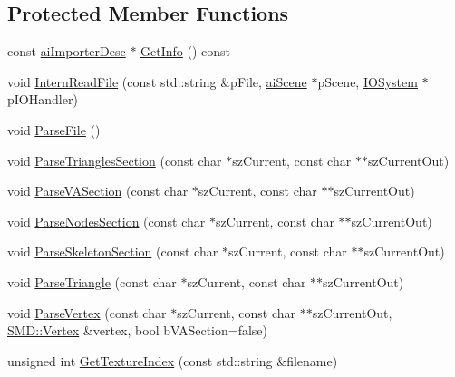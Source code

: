 \subsection*{Protected Member Functions}
\begin{DoxyCompactItemize}
\item 
const \hyperlink{structai_importer_desc}{ai\+Importer\+Desc} $\ast$ \hyperlink{class_assimp_1_1_s_m_d_importer_a0771ff94e143b92b6367358041272aa8}{Get\+Info} () const 
\item 
void \hyperlink{class_assimp_1_1_s_m_d_importer_a4f1ad132927d8077a231228223b392eb}{Intern\+Read\+File} (const std\+::string \&p\+File, \hyperlink{structai_scene}{ai\+Scene} $\ast$p\+Scene, \hyperlink{class_assimp_1_1_i_o_system}{I\+O\+System} $\ast$p\+I\+O\+Handler)
\item 
void \hyperlink{class_assimp_1_1_s_m_d_importer_a4075b3c88e26fa5d812dee09c4021223}{Parse\+File} ()
\item 
void \hyperlink{class_assimp_1_1_s_m_d_importer_a0dd80205c4b35fbade3d38da409c8738}{Parse\+Triangles\+Section} (const char $\ast$sz\+Current, const char $\ast$$\ast$sz\+Current\+Out)
\item 
void \hyperlink{class_assimp_1_1_s_m_d_importer_a735002509fc018d5fd3efb81c21da1d2}{Parse\+V\+A\+Section} (const char $\ast$sz\+Current, const char $\ast$$\ast$sz\+Current\+Out)
\item 
void \hyperlink{class_assimp_1_1_s_m_d_importer_a25a905bb3aeb4b3768386ef44a7a4ce1}{Parse\+Nodes\+Section} (const char $\ast$sz\+Current, const char $\ast$$\ast$sz\+Current\+Out)
\item 
void \hyperlink{class_assimp_1_1_s_m_d_importer_af68b8664e8e3ed61c3feb4a6a51ae912}{Parse\+Skeleton\+Section} (const char $\ast$sz\+Current, const char $\ast$$\ast$sz\+Current\+Out)
\item 
void \hyperlink{class_assimp_1_1_s_m_d_importer_a220c7c5a0c1014fa47c18a2d92a17791}{Parse\+Triangle} (const char $\ast$sz\+Current, const char $\ast$$\ast$sz\+Current\+Out)
\item 
void \hyperlink{class_assimp_1_1_s_m_d_importer_ad6228e5d706032985118ea4dc4ee1ed4}{Parse\+Vertex} (const char $\ast$sz\+Current, const char $\ast$$\ast$sz\+Current\+Out, \hyperlink{struct_assimp_1_1_s_m_d_1_1_vertex}{S\+M\+D\+::\+Vertex} \&vertex, bool b\+V\+A\+Section=false)
\item 
unsigned int \hyperlink{class_assimp_1_1_s_m_d_importer_accb2ea5eff088bd164576914b83e20c8}{Get\+Texture\+Index} (const std\+::string \&filename)
\item 

\end{DoxyCompactItemize}
